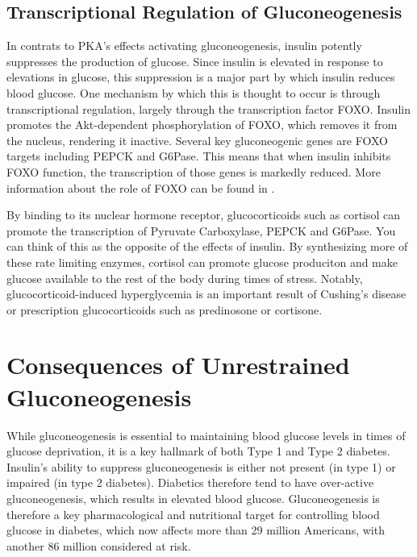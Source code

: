 \documentclass{tufte-handout}
\begin{document}
\subsection{Transcriptional Regulation of Gluconeogenesis}

In contrats to PKA's effects activating gluconeogenesis, insulin potently suppresses the production of glucose.  Since insulin is elevated in response to elevations in glucose, this suppression is a major part by which insulin reduces blood glucose.  One mechanism by which this is thought to occur is through transcriptional regulation, largely through the transcription factor FOXO.  Insulin promotes the Akt-dependent phosphorylation of FOXO, which removes it from the nucleus, rendering it inactive.  Several key gluconeogenic genes are FOXO targets including PEPCK and G6Pase.  This means that when insulin inhibits FOXO function, the transcription of those genes is markedly reduced.  More information about the role of FOXO can be found in \citet{Barthel2005}.

  By binding to its nuclear hormone receptor, glucocorticoids such as cortisol can promote the transcription of Pyruvate Carboxylase, PEPCK and G6Pase.  You can think of this as the opposite of the effects of insulin.  By synthesizing more of these rate limiting enzymes, cortisol can promote glucose produciton and make glucose available to the rest of the body during times of stress.  Notably, glucocorticoid-induced hyperglycemia is an important result of Cushing's disease or prescription glucocorticoids such as predinosone or cortisone.

\section{Consequences of Unrestrained Gluconeogenesis}

While gluconeogenesis is essential to maintaining blood glucose levels in times of glucose deprivation, it is a key hallmark of both Type 1 and Type 2 diabetes.  Insulin's ability to suppress gluconeogenesis is either not present (in type 1) or impaired (in type 2 diabetes).  Diabetics therefore tend to have over-active gluconeogenesis, which results in elevated blood glucose.  Gluconeogenesis is therefore a key pharmacological and nutritional target for controlling blood glucose in diabetes, which now affects more than 29 million Americans, with another 86 million considered at risk\cite{CentersforDiseaseControl2016}.






\end{document}
